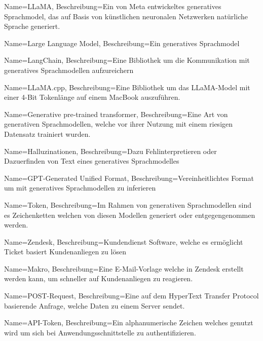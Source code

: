 \makeglossaries
{}
{
    Name=LLaMA,
    Beschreibung={Ein von Meta entwickeltes generatives Sprachmodel, das auf Basis von künstlichen neuronalen Netzwerken natürliche Sprache generiert. }
}

{
    Name=Large Language Model,
    Beschreibung={Ein generatives Sprachmodel}
}

{
    Name=LangChain,
    Beschreibung={Eine Bibliothek um die Kommunikation mit generatives Sprachmodellen aufzureichern }
}

{
    Name=LLaMA.cpp,
    Beschreibung={Eine Bibliothek um das LLaMA-Model mit einer 4-Bit Tokenlänge auf einem MacBook auszuführen.}
}

{
    Name=Generative pre-trained transformer,
    Beschreibung={Eine Art von generativen Sprachmodellen, welche vor ihrer Nutzung mit einem riesigen Datensatz trainiert wurden.}
}

{
    Name=Halluzinationen,
    Beschreibung={Dazu Fehlinterpretieren oder Dazuerfinden von Text eines generatives Sprachmodelles}
}

{
    Name=GPT-Generated Unified Format,
    Beschreibung={Vereinheitlichtes Format um mit generatives Sprachmodellen zu inferieren}
}

{
    Name=Token,
    Beschreibung={Im Rahmen von generativen Sprachmodellen sind es Zeichenketten welchen von diesen Modellen generiert oder entgegengenommen werden.}
}

{
    Name=Zendesk,
    Beschreibung={Kundendienst Software, welche es ermöglicht Ticket basiert Kundenanliegen zu lösen}
}

{
    Name=Makro,
    Beschreibung={Eine E-Mail-Vorlage welche in Zendesk erstellt werden kann, um schneller auf Kundenanliegen zu reagieren.}
}

{
    Name=POST-Request,
    Beschreibung={Eine auf dem HyperText Transfer Protocol basierende Anfrage, welche Daten zu einem Server sendet. }
}

{
    Name=API-Token,
    Beschreibung={Ein alphanumerische Zeichen welches genutzt wird um sich bei Anwendungsschnittstelle zu authentifizieren.}
}

\glsaddall
\glsaddallunused
\printglossary


